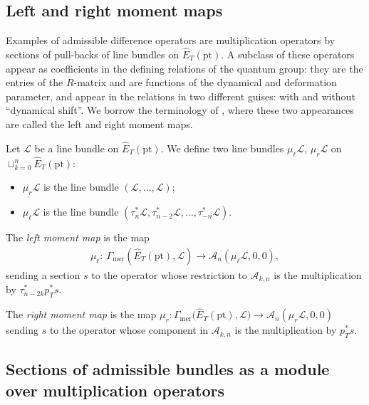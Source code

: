 \documentclass[10pt,a4paper]{amsart}
\numberwithin{equation}{section}
\begin{document}
\subsection{Left and right moment maps}

Examples of admissible difference operators are multiplication operators by sections of pull-backs of line bundles on $\hat E_T(\mathrm{pt})$. A subclass of these operators appear as coefficients in the defining relations of
the quantum group: they are the entries of the $R$-matrix and are functions of the dynamical and deformation parameter, and appear in the relations in two different guises: with and without ``dynamical shift''. We borrow the terminology of \cite[Section~3]{EtingofVarchenko}, where these two appearances are called the left and right moment maps.

Let $\mathcal L$ be a line bundle on $\hat E_T(\mathrm{pt})$. We define two line bundles $\mu_\ell\mathcal L$, $\mu_r\mathcal L$ on $\sqcup_{k=0}^n\hat E_T(\mathrm{pt})$:
\begin{itemize}\itemsep=0pt
\item $\mu_r\mathcal L$ is the line bundle $(\mathcal L,\dots,\mathcal L)$;
\item $\mu_\ell\mathcal L$ is the line bundle $(\tau_n^*\mathcal L,\tau_{n-2}^*\mathcal L,\dots,\tau_{-n}^*\mathcal L)$.
\end{itemize}
\begin{Definition} The {\em left moment map} is the map
 \begin{gather*}
 \mu_\ell\colon \ \Gamma_{\mathrm{mer}}(\hat E_T(\mathrm{pt}),\mathcal L)\to\mathcal A_n(\mu_\ell\mathcal L,0,0),
 \end{gather*}
 sending a section $s$ to the operator whose restriction to $\mathcal A_{k,n}$ is the multiplication by $\tau_{n-2k}^*p_T^*s$.

The {\em right moment map} is the map $\mu_r\colon\Gamma_{\mathrm{mer}}\big(\hat E_T(\mathrm{pt}),\mathcal L\big) \to\mathcal A_n(\mu_r\mathcal L,0,0)$ sending $s$ to the operator whose component in $\mathcal A_{k,n}$ is
the multiplication by $p_T^*s$.
\end{Definition}
\subsection{Sections of admissible bundles as a module over multiplication operators}
\end{document}
